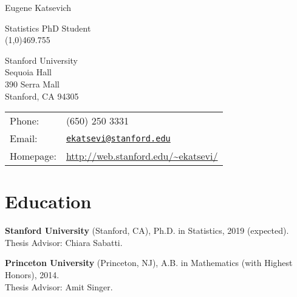 \documentclass[letterpaper]{article}
\def\name{Eugene Katsevich}
\newenvironment{itemizenob}{
  \begin{list}{}{
    \setlength{\leftmargin}{1.5em}
  }
}{
  \end{list}
}
\begin{document}
{\huge \name}

\vspace{0.05in}
{\large Statistics PhD Student} \vspace{-0.2in}\\

\line(1,0){469.755}
\vspace{0.25in}

\begin{minipage}{0.49\linewidth}
  Stanford University \\
  Sequoia Hall \\
  390 Serra Mall \\
  Stanford, CA 94305
\end{minipage}
\begin{minipage}{0.49\linewidth}
  \begin{tabular}{ll}
    Phone: & (650) 250 3331 \\
    Email: & \href{mailto:ekatsevi@stanford.edu}{\nolinkurl{ekatsevi@stanford.edu}}\\
    Homepage: & \url{http://web.stanford.edu/~ekatsevi/} \\
  \end{tabular}
\end{minipage}



\section*{Education}
\begin{itemizenob}\addtolength{\itemsep}{-0.2\baselineskip}
\item {\bf Stanford University} (Stanford, CA), Ph.D. in Statistics,
  2019 (expected). \\ Thesis Advisor: Chiara Sabatti.

\item {\bf Princeton University} (Princeton, NJ), A.B. in Mathematics
  (with Highest Honors), 2014. \\ Thesis Advisor: Amit Singer.
\end{itemizenob}
\end{document}
